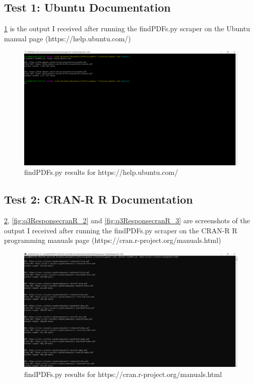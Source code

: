 \documentclass[12pt]{article}
\begin{document}
\subsection*{Test 1: Ubuntu Documentation} 
\ref{fig:q3ResponseUbuntu} is the output I received after running the findPDFs.py scraper on the Ubuntu manual page (https://help.ubuntu.com/)
\begin{figure}[H]
    \centering
    \includegraphics[trim=0 400 400 20, clip, width=\textwidth] {Q3/q3_ubuntuHelp.png}
    \caption{findPDFs.py results for https://help.ubuntu.com/}
    \label{fig:q3ResponseUbuntu}
\end{figure}
\pagebreak
\subsection*{Test 2: CRAN-R R Documentation} 
\ref{fig:q3ResponsecranR_1}, \ref{fig:q3ResponsecranR_2} and \ref{fig:q3ResponsecranR_3} are screenshots of the output I received after running the findPDFs.py scraper on the CRAN-R R programming manuals page (https://cran.r-project.org/manuals.html)
\begin{figure}[H]
    \centering
    \includegraphics[trim=0 50 400 10, clip, width=\textwidth] {Q3/q3_cranRManuals.png}
    \caption{findPDFs.py results for https://cran.r-project.org/manuals.html}
    \label{fig:q3ResponsecranR_1}
\end{figure}
\end{document}
